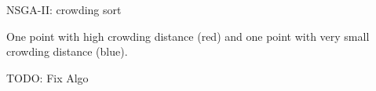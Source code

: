\begin{frame}[allowframebreaks]{NSGA-II: crowding sort}
\begin{footnotesize}
One point with high crowding distance (red) and one point with very small crowding distance (blue).
\end{footnotesize}

\framebreak
TODO: Fix Algo
%

\end{frame}






